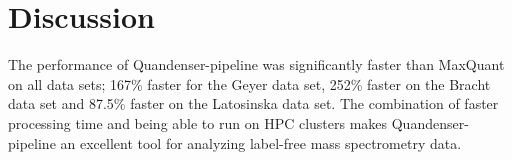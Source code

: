 \documentclass[11pt]{article}
\begin{document}

\section*{Discussion}
The performance of Quandenser-pipeline was significantly faster than MaxQuant on all data sets; 167\% faster for the Geyer data set, 252\% faster on the Bracht data set and 87.5\% faster on the Latosinska data set. The combination of faster processing time and being able to run on HPC clusters makes Quandenser-pipeline an excellent tool for analyzing label-free mass spectrometry data.
\end{document}
